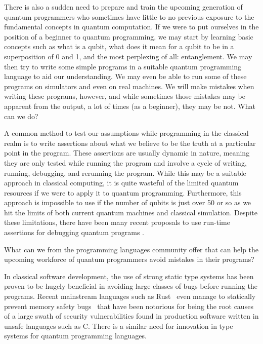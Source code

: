 There is also a sudden need to prepare and train the upcoming generation of quantum programmers who sometimes have little to no previous exposure to the fundamental concepts in quantum computation. If we were to put ourselves in the position of a beginner to quantum programming, we may start by learning basic concepts such as what is a qubit, what does it mean for a qubit to be in a superposition of 0 and 1, and the most perplexing of all: entanglement. We may then try to write some simple programs in a suitable quantum programming language to aid our understanding. We may even be able to run some of these programs on simulators and even on real machines. We will make mistakes when writing these programs, however, and while sometimes those mistakes may be apparent from the output, a lot of times (as a beginner), they may be not. What can we do?

A common method to test our assumptions while programming in the classical realm is to write assertions about what we believe to be the truth at a particular point in the program. These assertions are usually dynamic in nature, meaning they are only tested while running the program and involve a cycle of writing, running, debugging, and rerunning the program. While this may be a suitable approach in classical computing, it is quite wasteful of the limited quantum resources if we were to apply it to quantum programming. Furthermore, this approach is impossible to use if the number of qubits is just over 50 or so as we hit the limits of both current quantum machines and classical simulation. Despite these limitations, there have been many recent proposals to use run-time assertions for debugging quantum programs \parencite{Li2020,huang2019}.

What can we from the programming languages community offer that can help the upcoming workforce of quantum programmers avoid mistakes in their programs?

In classical software development, the use of strong static type systems has been proven to be hugely beneficial in avoiding large classes of bugs before running the programs. Recent mainstream languages such as Rust~\parencite{matsakis2014} even manage to statically prevent memory safety bugs~\parencite{xu2021memorysafety,Jung2017,Jung2021} that have been notorious for being the root causes of a large swath of security vulnerabilities found in production software written in unsafe languages such as C. There is a similar need for innovation in type systems for quantum programming languages.

